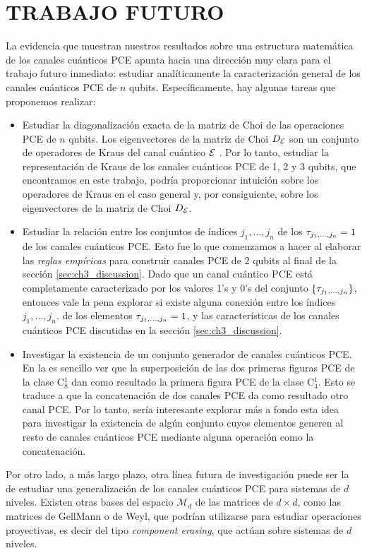 \chapter{TRABAJO FUTURO}
La evidencia que muestran nuestros resultados sobre una estructura 
matemática de los canales cuánticos PCE apunta hacia una dirección 
muy clara para el trabajo futuro inmediato: estudiar analíticamente la caracterización 
general de los canales cuánticos PCE de $n$ qubits. Específicamente, hay algunas 
tareas que proponemos realizar:
\begin{itemize}
\item Estudiar la diagonalización exacta de la matriz de Choi de las operaciones 
PCE de $n$ qubits. Los eigenvectores de la matriz de Choi $D_{\mathcal{E}}$
son un conjunto de operadores de Kraus del canal cuántico $\mathcal{E}$ 
\cite{bengtsson_zyczkowski_2017}. Por lo tanto, 
estudiar la representación de Kraus de los canales cuánticos PCE de 1, 2 y 3 qubits,
que encontramos en este trabajo, podría proporcionar intuición 
sobre los operadores de Kraus en el caso general y, por consiguiente, 
sobre los eigenvectores de la matriz de Choi $D_{\mathcal{E}}$. 
\item Estudiar la relación entre los conjuntos de índices $j_1,\ldots,j_n$
de los $\tau_{j_1,\ldots ,j_n}=1$ de los canales cuánticos PCE. Esto fue lo que comenzamos 
a hacer al elaborar las \textit{reglas empíricas} para construir canales PCE de 2 qubits
al final de la sección \ref{sec:ch3_discussion}. Dado que un canal cuántico PCE 
está completamente caracterizado por los valores 1's y 0's del conjunto $\qty{\tau_{j_1,\ldots ,j_n}}$, 
entonces vale la pena explorar si existe alguna conexión entre los índices $j_1,\ldots,j_n$. de los 
elementos $\tau_{j_1,\ldots ,j_n}=1$, y las características de los canales 
cuánticos PCE discutidas en la sección \ref{sec:ch3_discussion}.
\item Investigar la existencia de un conjunto generador de canales cuánticos 
PCE. En la  es sencillo ver que la superposición
de las dos primeras figuras PCE de la clase C${}_8^1$ dan como resultado 
la primera figura PCE de la clase C${}_4^1$. Esto se traduce a que la 
concatenación de dos canales PCE da como resultado otro canal PCE. Por lo tanto,
sería interesante explorar más a fondo esta idea para investigar la existencia 
de algún conjunto cuyos elementos generen al resto de canales cuánticos PCE 
mediante alguna operación como la concatenación.
\end{itemize}
Por otro lado, a más largo plazo, otra línea futura de investigación puede ser 
la de estudiar una generalización de los canales cuánticos PCE para sistemas 
de $d$ niveles. Existen otras bases del espacio $\mathcal{M}_d$ de las matrices de 
$d\times d$, como las matrices de GellMann o de Weyl, 
que podrían utilizarse para estudiar operaciones proyectivas, es decir
del tipo \textit{component erasing}, que actúan sobre sistemas de $d$ niveles.